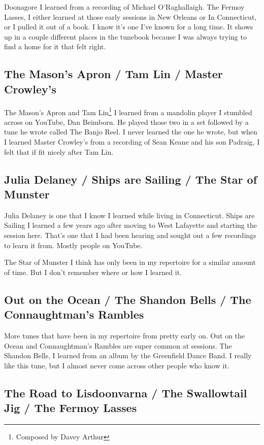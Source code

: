 \documentclass[9pt,letterpaper]{article}
\begin{document}
{Doonagore I learned from a recording of Michael O'Raghallaigh. The Fermoy Lasses, I either learned at those early sessions in New Orleans or In Connecticut, or I pulled it out of a book. I know it's one I've known for a long time. It shows up in a couple different places in the tunebook because I was always trying to find a home for it that felt right.

\subsection{The Mason's Apron / Tam Lin / Master Crowley's}

The Mason's Apron and Tam Lin\footnote{Composed by Davey Arthur} I learned from a mandolin player I stumbled across on YouTube, Dan Beimborn. He played those two in a set followed by a tune he wrote called The Banjo Reel. I never learned the one he wrote, but when I learned Master Crowley's from a recording of Sean Keane and his son Padraig, I felt that if fit nicely after Tam Lin.

\subsection{Julia Delaney / Ships are Sailing / The Star of Munster}
Julia Delaney is one that I know I learned while living in Connecticut. Ships are Sailing I learned a few years ago after moving to West Lafayette and starting the session here. That's one that I had been hearing and sought out a few recordings to learn it from. Mostly people on YouTube.

The Star of Munster I think has only been in my repertoire for a similar amount of time. But I don't remember where or how I learned it.

\subsection{Out on the Ocean / The Shandon Bells / The Connaughtman's Rambles}

More tunes that have been in my repertoire from pretty early on. Out on the Ocean and Connaughtman's Rambles are super common at sessions. The Shandon Bells, I learned from an album by the Greenfield Dance Band. I really like this tune, but I almost never come across other people who know it.

\subsection{The Road to Lisdoonvarna / The Swallowtail Jig / The Fermoy Lasses}

}
\end{document}
